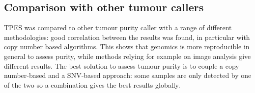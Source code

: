     \subsection{Comparison with other tumour callers}
    TPES was compared to other tumour purity caller with a range of different methodologies: good correlation between the results was found, in particular with copy number based algorithms.
    This shows that genomics is more reproducible in general to assess purity, while methods relying for example on image analysis give different results.
    The best solution to assess tumour purity is to couple a copy number-based and a SNV-based approach: some samples are only detected by one of the two so a combination gives the best results globally.
